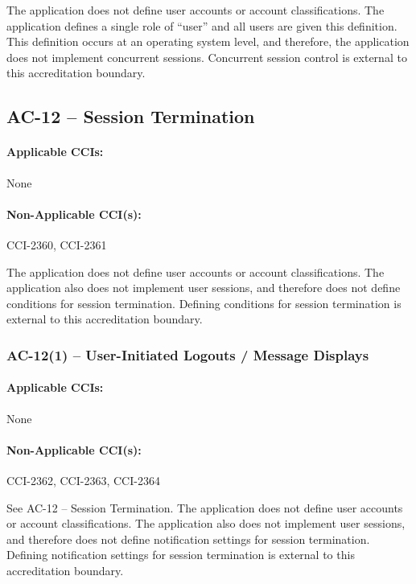 \documentclass[letterpaper, 10pt, twoside]{article}
\begin{document}
The application does not define user accounts or account classifications. The application defines a single role of “user” and all users are given this definition. This definition occurs at an operating system level, and therefore, the application does not implement concurrent sessions. Concurrent session control is external to this accreditation boundary.

\subsection{AC-12 -- Session Termination}
\label{sec:ac-12}

\paragraph{Applicable CCIs:} None

\paragraph{Non-Applicable CCI(s):} CCI-2360, CCI-2361

The application does not define user accounts or account classifications. The application also does not implement user sessions, and therefore does not define conditions for session termination. Defining conditions for session termination is external to this accreditation boundary.

\subsubsection{AC-12(1) -- User-Initiated Logouts / Message Displays}

\paragraph{Applicable CCIs:} None

\paragraph{Non-Applicable CCI(s):} CCI-2362, CCI-2363, CCI-2364

See AC-12 – Session Termination. The application does not define user accounts or account classifications. The application also does not implement user sessions, and therefore does not define notification settings for session termination. Defining notification settings for session termination is external to this accreditation boundary.
\end{document}
